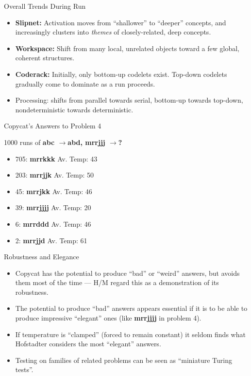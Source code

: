 \documentclass{article}
\begin{document}
\begin{slide}
{\Large Overall Trends During Run}
\begin{itemize}
\item {\bf Slipnet:} Activation moves from ``shallower'' to
``deeper'' concepts, and increasingly clusters into {\em themes} of
closely-related, deep concepts.
\item {\bf Workspace:} Shift from many local, unrelated objects toward
a few global, coherent structures.
\item {\bf Coderack:} Initially, only bottom-up codelets
exist. Top-down codelets gradually come to dominate as a run proceeds.
\item Processing: shifts from parallel towards serial, bottom-up
towards top-down, nondeterministic towards deterministic.
\end{itemize}
\end{slide}

\begin{slide}
{\Large Copycat's Answers to Problem 4}

1000 runs of {\bf abc $\rightarrow$\space abd, mrrjjj $\rightarrow$\space ?}
\begin{itemize}
\item 705: {\bf mrrkkk} Av. Temp: 43
\item 203: {\bf mrrjjk} Av. Temp: 50
\item 45: {\bf mrrjkk} Av. Temp: 46
\item 39: {\bf mrrjjjj} Av. Temp: 20
\item 6: {\bf mrrddd} Av. Temp: 46
\item 2: {\bf mrrjjd} Av. Temp: 61
\end{itemize}
\end{slide}

\begin{slide}
{\Large Robustness and Elegance}
\begin{itemize}
\item Copycat has the potential to produce ``bad'' or ``weird''
answers, but avoids them most of the time --- H/M regard this
as a demonstration of its robustness.
\item The potential to produce ``bad'' answers appears essential if it
is to be able to produce impressive ``elegant'' ones (like {\bf
mrrjjjj} in problem 4). 
\item If temperature is ``clamped'' (forced to remain constant) it
seldom finds what Hofstadter considers the most ``elegant'' answers.
\item Testing on families of related problems can be seen as
``miniature Turing tests''.
\end{itemize}
\end{slide}
\end{document}
